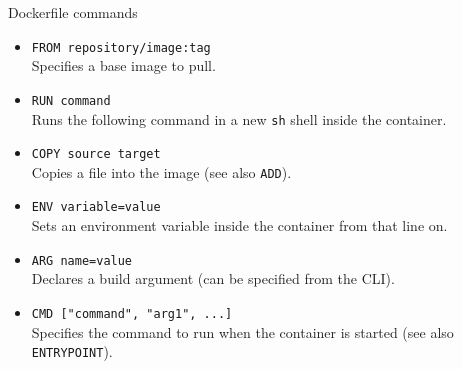 \begin{frame}{Dockerfile commands}
	\begin{itemize}
		\item \texttt{FROM repository/image:tag}\\Specifies a base image to pull.
		\item \texttt{RUN command}\\Runs the following command in a new \texttt{sh} shell inside the container.
		\item \texttt{COPY source target}\\Copies a file into the image (see also \texttt{ADD}).
		\item \texttt{ENV variable=value}\\Sets an environment variable inside the container from that line on.
		\item \texttt{ARG name=value}\\Declares a build argument (can be specified from the CLI).
		\item \texttt{CMD ["command", "arg1", ...]}\\Specifies the command to run when the container is started (see also \texttt{ENTRYPOINT}).
	\end{itemize}
\end{frame}

